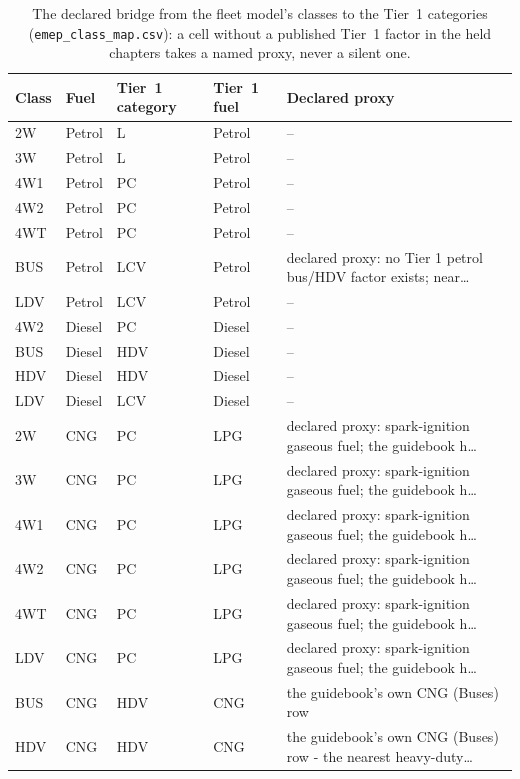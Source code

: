 \begin{table}[!htbp]
\centering
\scriptsize
\begin{tabular}{@{}lllll@{}}
\toprule
\textbf{Class} & \textbf{Fuel} & \textbf{Tier~1 category} & \textbf{Tier~1 fuel} & \textbf{Declared proxy} \\
\midrule
2W & Petrol & L & Petrol & -- \\
3W & Petrol & L & Petrol & -- \\
4W1 & Petrol & PC & Petrol & -- \\
4W2 & Petrol & PC & Petrol & -- \\
4WT & Petrol & PC & Petrol & -- \\
BUS & Petrol & LCV & Petrol & declared proxy: no Tier 1 petrol bus/HDV factor exists; near\dots \\
LDV & Petrol & LCV & Petrol & -- \\
4W2 & Diesel & PC & Diesel & -- \\
BUS & Diesel & HDV & Diesel & -- \\
HDV & Diesel & HDV & Diesel & -- \\
LDV & Diesel & LCV & Diesel & -- \\
2W & CNG & PC & LPG & declared proxy: spark-ignition gaseous fuel; the guidebook h\dots \\
3W & CNG & PC & LPG & declared proxy: spark-ignition gaseous fuel; the guidebook h\dots \\
4W1 & CNG & PC & LPG & declared proxy: spark-ignition gaseous fuel; the guidebook h\dots \\
4W2 & CNG & PC & LPG & declared proxy: spark-ignition gaseous fuel; the guidebook h\dots \\
4WT & CNG & PC & LPG & declared proxy: spark-ignition gaseous fuel; the guidebook h\dots \\
LDV & CNG & PC & LPG & declared proxy: spark-ignition gaseous fuel; the guidebook h\dots \\
BUS & CNG & HDV & CNG & the guidebook's own CNG (Buses) row \\
HDV & CNG & HDV & CNG & the guidebook's own CNG (Buses) row - the nearest heavy-duty\dots \\
\bottomrule
\end{tabular}
\caption{The declared bridge from the fleet model's classes to the Tier~1
categories (\texttt{emep\_class\_map.csv}): a cell without a published
Tier~1 factor in the held chapters takes a named proxy, never a silent one.}
\label{tab:s2classmap}
\end{table}

